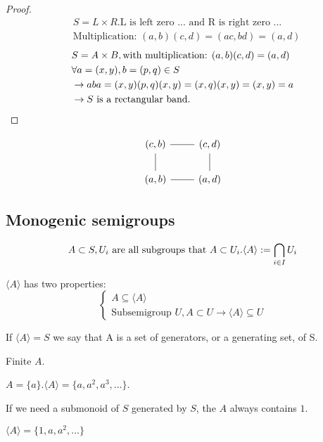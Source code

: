 \begin{Them}
\begin{proof}
        \begin{align*}
            &S=L\times R.\text{L is left zero ... and R is right zero ...}  \\
            &\text{Multiplication: } (a,b)(c,d)=(ac,bd)=(a,d)
        \end{align*}
        \begin{align*}
            &S=A\times B, \text{with multiplication: }(a,b)(c,d)=(a,d)\\
            &\forall a=(x,y),b=(p,q)\in S   \\
            &\rightarrow aba=(x,y)(p,q)(x,y)=(x,q)(x,y)=(x,y)=a \\
            &\rightarrow S\text{\space is a rectangular band.}
        \end{align*}
    \end{proof}
    \[\begin{tikzcd}
        (c,b)
            \arrow[r, dash]
            \arrow[d, dash] &
        (c,d)
            \arrow[d, dash] \\
        (a,b)
            \arrow[r, dash] &
        (a,d)
    \end{tikzcd}\]

\end{Them}

\subsection[2]{Monogenic semigroups}

\begin{Sym}
    \[
        A \subset S, U_i \text{\space are all subgroups that }A \subset U_i.\langle A \rangle:=\bigcap_{i \in I}U_i
    \]
    
    $\langle A \rangle$ has two properties:
    \[\begin{cases}
        A \subseteq \langle A\rangle    \\
        \text{Subsemigroup } U, A\subset U \rightarrow \langle A\rangle \subseteq U
    \end{cases}\]

    If $\langle A\rangle = S$ we say that A is a set of generators, or a generating set, of S.
\end{Sym}

\begin{Exap}
    Finite $A$.

    $A=\{a\}. \langle A\rangle=\{a,a^2,a^3,...\}$.

    If we need a submonoid of $S$ generated by $S$, the $A$ always contains $1$.

    $\langle A \rangle=\{1,a,a^2,...\}$
\end{Exap}

